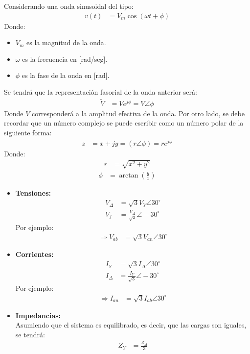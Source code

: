 \documentclass[
  11pt,
  letterpaper,
   addpoints,
  ]{exam}
\begin{document}
Considerando una onda sinusoidal del tipo:
\begin{align}
v(t) &= V_m \cos(\omega t + \phi)
\end{align}
Donde:
\begin{itemize}
    \item $V_m$ es la magnitud de la onda.
    \item $\omega$ es la frecuencia en [rad/seg].
    \item $\phi$ es la fase de la onda en [rad].
\end{itemize}
Se tendrá que la representación fasorial de la onda anterior será:
\begin{align}
\tilde{V} &= V e^{j\phi} = V \angle \phi
\end{align}
Donde $V$ corresponderá a la amplitud efectiva de la onda. Por otro lado, se debe recordar que un número complejo se puede escribir como un número polar de la siguiente forma:
\begin{align}
z &= x + jy = (r \angle \phi) = r e^{j\phi}
\end{align}
Donde:
\begin{align}
r &= \sqrt{x^2 + y^2}
\end{align}
\begin{align}
\phi &= \arctan\left(\frac{y}{x}\right)
\end{align}
\begin{itemize}
    \item \textbf{Tensiones:}
    \begin{align}
        V_{\Delta} &= \sqrt{3} V_Y \angle 30^\circ \\
        V_f &= \frac{V_{\Delta}}{\sqrt{3}} \angle -30^\circ
    \end{align}
    Por ejemplo:
    \begin{align}
        \Rightarrow V_{ab} &= \sqrt{3} V_{an} \angle 30^\circ
    \end{align}
    
    \item \textbf{Corrientes:}
    \begin{align}
        I_Y &= \sqrt{3} I_{\Delta} \angle 30^\circ \\
        I_{\Delta} &= \frac{I_Y}{\sqrt{3}} \angle -30^\circ
    \end{align}
    Por ejemplo:
    \begin{align}
        \Rightarrow I_{an} &= \sqrt{3} I_{ab} \angle 30^\circ
    \end{align}
    
    \item \textbf{Impedancias:} \\
    Asumiendo que el sistema es equilibrado, es decir, que las cargas son iguales, se tendrá:
    \begin{align}
        Z_Y &= \frac{Z_{\Delta}}{3}
    \end{align}
\end{itemize}
\end{document}
